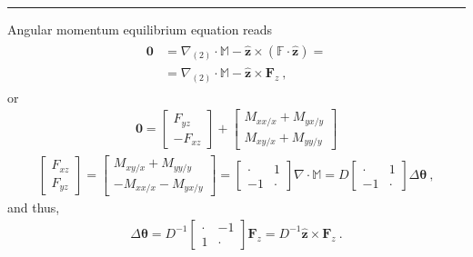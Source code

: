 \documentclass[letterpaper,10pt,english]{jupyterBook}
\begin{document}
\bigskip\hrule\bigskip


\sphinxAtStartPar
Angular momentum equilibrium equation reads
\begin{equation*}
\begin{split}\begin{aligned}
 \mathbf{0}
 & = \nabla_{(2)} \cdot \mathbb{M} - \hat{\mathbf{z}}\times \left( \mathbb{F} \cdot \hat{\mathbf{z}} \right) = \\
 & = \nabla_{(2)} \cdot \mathbb{M} - \hat{\mathbf{z}}\times \mathbf{F}_z \ ,
\end{aligned}\end{split}
\end{equation*}
\sphinxAtStartPar
or
\begin{equation*}
\begin{split}\mathbf{0} = \begin{bmatrix} F_{yz} \\ -F_{xz} \end{bmatrix} + \begin{bmatrix} M_{xx/x} + M_{yx/y} \\ M_{xy/x} + M_{yy/y} \end{bmatrix} \end{split}
\end{equation*}\begin{equation*}
\begin{split}\begin{bmatrix} F_{xz} \\ F_{yz} \end{bmatrix} = \begin{bmatrix}  M_{xy/x} + M_{yy/y} \\ - M_{xx/x} - M_{yx/y} \end{bmatrix} = \begin{bmatrix} \cdot & 1 \\ -1 & \cdot \end{bmatrix} \nabla \cdot \mathbb{M} =  D \begin{bmatrix} \cdot &  1 \\ -1 & \cdot \end{bmatrix} \Delta \boldsymbol{\theta} \ ,\end{split}
\end{equation*}
\sphinxAtStartPar
and thus,
\begin{equation*}
\begin{split}\Delta \boldsymbol{\theta} = D^{-1} \begin{bmatrix} \cdot & -1  \\ 1 & \cdot \end{bmatrix} \mathbf{F}_z = D^{-1} \hat{\mathbf{z}} \times \mathbf{F}_z \ .\end{split}
\end{equation*}
\end{document}
